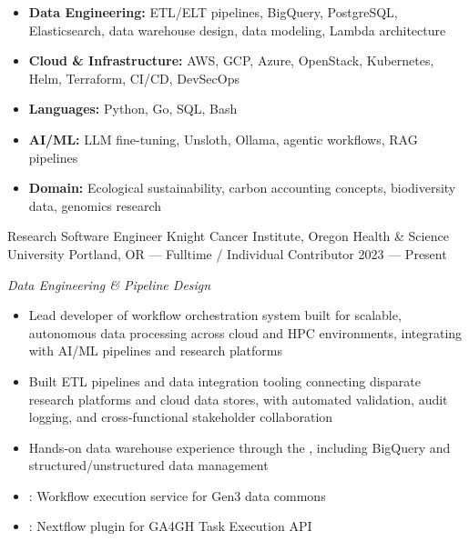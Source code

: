 




\begin{itemize}
    \item \textbf{Data Engineering:} ETL/ELT pipelines, BigQuery, PostgreSQL, Elasticsearch, data warehouse design, data modeling, Lambda architecture
    \item \textbf{Cloud \& Infrastructure:} AWS, GCP, Azure, OpenStack, Kubernetes, Helm, Terraform, CI/CD, DevSecOps
    \item \textbf{Languages:} Python, Go, SQL, Bash
    \item \textbf{AI/ML:} LLM fine-tuning, Unsloth, Ollama, agentic workflows, RAG pipelines
    \item \textbf{Domain:} Ecological sustainability, carbon accounting concepts, biodiversity data, genomics research
\end{itemize}


\showoff
{Research Software Engineer}
{Knight Cancer Institute, Oregon Health \& Science University}
{Portland, OR --- Fulltime / Individual Contributor}
{2023 --- Present}

\vspace{1em}

\emph{Data Engineering \& Pipeline Design}

\begin{itemize}
    \item Lead developer of workflow orchestration system built for scalable, autonomous data processing across cloud and HPC environments, integrating with AI/ML pipelines and research platforms
    \item Built ETL pipelines and data integration tooling connecting disparate research platforms and cloud data stores, with automated validation, audit logging, and cross-functional stakeholder collaboration
    \item Hands-on data warehouse experience through the , including BigQuery and structured/unstructured data management
    \item {}: Workflow execution service for Gen3 data commons
    \item {}: Nextflow plugin for GA4GH Task Execution API
\end{itemize}

